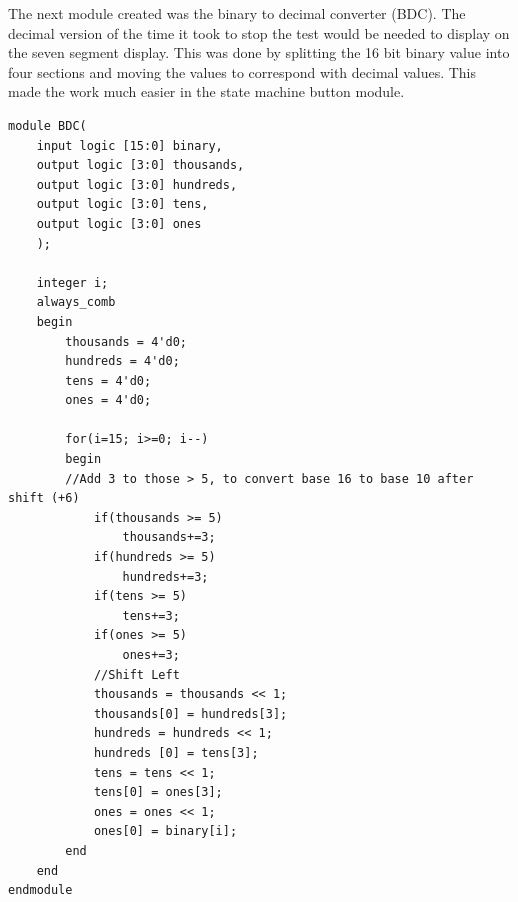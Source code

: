 \documentclass[11pt]{article}
\begin{document}
The next module created was the binary to decimal converter (BDC). The decimal version of the time it took to stop the test would be needed to display on the seven segment display. This was done by splitting the 16 bit binary value into four sections and moving the values to correspond with decimal values.  This made the work much easier in the state machine button module. 

\begin{lstlisting}[style=Verilog,caption=Binary to Decimal Converter Module ,label=code:ex ]
module BDC(
    input logic [15:0] binary,
    output logic [3:0] thousands,
    output logic [3:0] hundreds,
    output logic [3:0] tens,
    output logic [3:0] ones
    );
    
    integer i;
    always_comb
    begin
        thousands = 4'd0;
        hundreds = 4'd0;
        tens = 4'd0;
        ones = 4'd0;
        
        for(i=15; i>=0; i--)
        begin
        //Add 3 to those > 5, to convert base 16 to base 10 after shift (+6)
            if(thousands >= 5)
                thousands+=3;
            if(hundreds >= 5)
                hundreds+=3;
            if(tens >= 5)
                tens+=3;
            if(ones >= 5)
                ones+=3;
            //Shift Left
            thousands = thousands << 1;
            thousands[0] = hundreds[3];
            hundreds = hundreds << 1;
            hundreds [0] = tens[3];
            tens = tens << 1;
            tens[0] = ones[3];
            ones = ones << 1;
            ones[0] = binary[i];
        end
    end
endmodule
\end{lstlisting}
\end{document}
